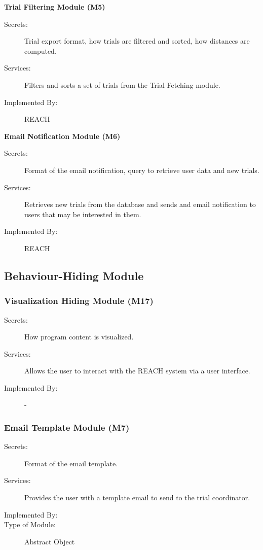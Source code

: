 \documentclass[12pt, titlepage]{article}
\begin{document}
\noindent \textbf{Trial Filtering Module (M5)}
\begin{description}
  \item[Secrets:] Trial export format, how trials are filtered and sorted, how distances are computed.
  \item[Services:] Filters and sorts a set of trials from the Trial Fetching module.
  \item[Implemented By:] REACH \\
\end{description}

\noindent \textbf{Email Notification Module (M6)}
\begin{description}
  \item[Secrets:] Format of the email notification, query to retrieve user data and new trials.
  \item[Services:] Retrieves new trials from the database and sends and email notification to users that may be interested in them.
  \item[Implemented By:] REACH  \\
\end{description}

\subsection{Behaviour-Hiding Module}

\subsubsection{Visualization Hiding Module (M17)}
\begin{description}
\item[Secrets:] How program content is visualized.
\item[Services:] Allows the user to interact with the REACH system via a user interface.
\item[Implemented By:] -
\end{description}

\subsubsection{Email Template Module (M7)}
\begin{description}
\item[Secrets:] Format of the email template.
\item[Services:] Provides the user with a template email to send to the trial coordinator.
\item[Implemented By:] 
\item[Type of Module:] Abstract Object \\
\end{description}
\end{document}
